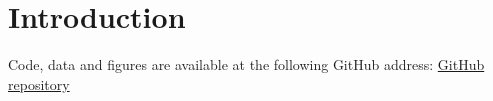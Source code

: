 \section{Introduction}
Code, data and figures are available at the following GitHub address:
\href{https://github.com/geirtul/fys-stk4155/tree/master/project3}{GitHub repository}\\
